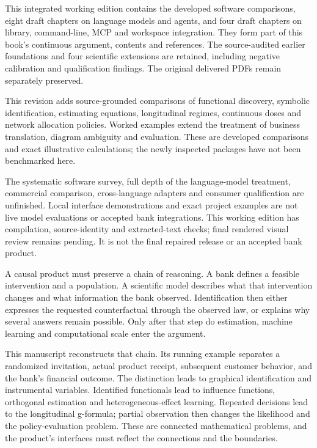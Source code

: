 \documentclass[11pt,a4paper,openany]{book}
\begin{document}
This integrated working edition contains the developed software comparisons,
eight draft chapters on language models and agents, and four draft chapters on
library, command-line, MCP and workspace integration. They form part of this
book's continuous argument, contents and references. The source-audited earlier
foundations and four scientific extensions are retained, including negative
calibration and qualification findings. The original delivered PDFs remain
separately preserved.

This revision adds source-grounded comparisons of functional discovery, symbolic identification, estimating equations, longitudinal regimes, continuous doses and network allocation policies. Worked examples extend the treatment of business translation, diagram ambiguity and evaluation. These are developed comparisons and exact illustrative calculations; the newly inspected packages have not been benchmarked here.

The systematic software survey, full depth of the language-model treatment,
commercial comparison, cross-language adapters and consumer qualification are
unfinished. Local interface demonstrations and exact project examples are not
live model evaluations or accepted bank integrations. This working edition has
compilation, source-identity and extracted-text checks; final rendered visual
review remains pending. It is not the final repaired release or an accepted
bank product.


A causal product must preserve a chain of reasoning. A bank defines a feasible
intervention and a population. A scientific model describes what that
intervention changes and what information the bank observed. Identification
then either expresses the requested counterfactual through the observed law,
or explains why several answers remain possible. Only after that step do
estimation, machine learning and computational scale enter the argument.

This manuscript reconstructs that chain. Its running example separates a
randomized invitation, actual product receipt, subsequent customer behavior,
and the bank's financial outcome. The distinction leads to graphical
identification and instrumental variables. Identified functionals lead to
influence functions, orthogonal estimation and heterogeneous-effect learning.
Repeated decisions lead to the longitudinal g-formula; partial observation
then changes the likelihood and the policy-evaluation problem. These are
connected mathematical problems, and the product's interfaces must reflect
the connections and the boundaries.
\end{document}
